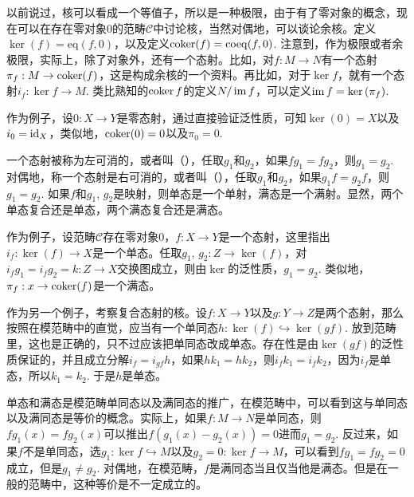 \para 以前说过，核可以看成一个等值子，所以是一种极限，由于有了零对象的概念，现在可以在存在零对象$0$的范畴$\mathcal{C}$中讨论核，当然对偶地，可以谈论余核。定义$\ker(f)=\mathrm{eq}(f,0)$，以及定义$\operatorname{coker}(f)=\mathrm{coeq}(f,0)$. 注意到，作为极限或者余极限，实际上，除了对象外，还有一个态射。比如，对$f:M\to N$有一个态射$\pi_f:M\to \operatorname{coker}(f)$，这是构成余核的一个资料。再比如，对于$\ker f$，就有一个态射$i_f:\ker f\to M$. 类比熟知的$\operatorname{coker} f$的定义$N/\operatorname{im} f$，可以定义$\operatorname{im} f=\ker\left(\pi_f\right)$. 

作为例子，设$0:X\to Y$是零态射，通过直接验证泛性质，可知$\ker(0)=X$以及$i_0=\operatorname{id}_X$，类似地，$\operatorname{coker}(0)=0$以及$\pi_0=0$.

\para 一个态射被称为左可消的，或者叫（），任取$g_1$和$g_2$，如果$fg_1=fg_2$，则$g_1=g_2$. 对偶地，称一个态射是右可消的，或者叫（），任取$g_1$和$g_2$，如果$g_1f=g_2f$，则$g_1=g_2$. 如果$f$和$g_1$, $g_2$是映射，则单态是一个单射，满态是一个满射。显然，两个单态复合还是单态，两个满态复合还是满态。

作为例子，设范畴$\mathcal{C}$存在零对象$0$，$f:X\to Y$是一个态射，这里指出$i_f:\ker(f)\to X$是一个单态。任取$g_1$, $g_2:Z\to \ker(f)$，对$i_fg_1=i_fg_2=k:Z\to X$交换图成立，则由$\ker$的泛性质，$g_1=g_2$. 类似地，$\pi_f:x\to\operatorname{coker}(f)$是一个满态。

作为另一个例子，考察复合态射的核。设$f:X\to Y$以及$g:Y\to Z$是两个态射，那么按照在模范畴中的直觉，应当有一个单同态$h:\ker(f)\hookrightarrow \ker(gf)$. 放到范畴里，这也是正确的，只不过应该把单同态改成单态。存在性是由$\ker(gf)$的泛性质保证的，并且成立分解$i_f=i_{gf}h$，如果$hk_1=hk_2$，则$i_fk_1=i_fk_2$，因为$i_f$是单态，所以$k_1=k_2$. 于是$h$是单态。

单态和满态是模范畴单同态以及满同态的推广，在模范畴中，可以看到这与单同态以及满同态是等价的概念。实际上，如果$f:M\to N$是单同态，则$fg_1(x)=fg_2(x)$可以推出$f(g_1(x)-g_2(x))=0$进而$g_1=g_2$. 反过来，如果$f$不是单同态，选$g_1:\ker f\hookrightarrow M$以及$g_2=0:\ker f\to M$，可以看到$fg_1=fg_2=0$成立，但是$g_1\neq g_2$. 对偶地，在模范畴，$f$是满同态当且仅当他是满态。但是在一般的范畴中，这种等价是不一定成立的。


